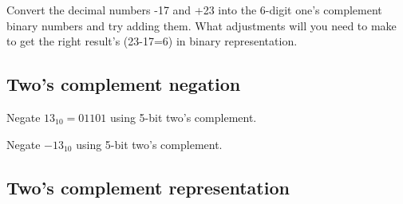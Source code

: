 \begin{prob}
  Convert the decimal numbers -17 and +23 into the 6-digit one's complement binary numbers and try adding them. What
  adjustments will you need to make to get the right result's (23-17=6) in binary representation.
\end{prob}
\vspace{20em}


\subsection{Two's complement negation}

Negate $13_{10} = 01101$ using 5-bit two's complement.
\vspace{10em}

\noindent Negate $-13_{10}$ using 5-bit two's complement.
\vspace{10em}



\subsection{Two's complement representation}

\vspace{20em}

